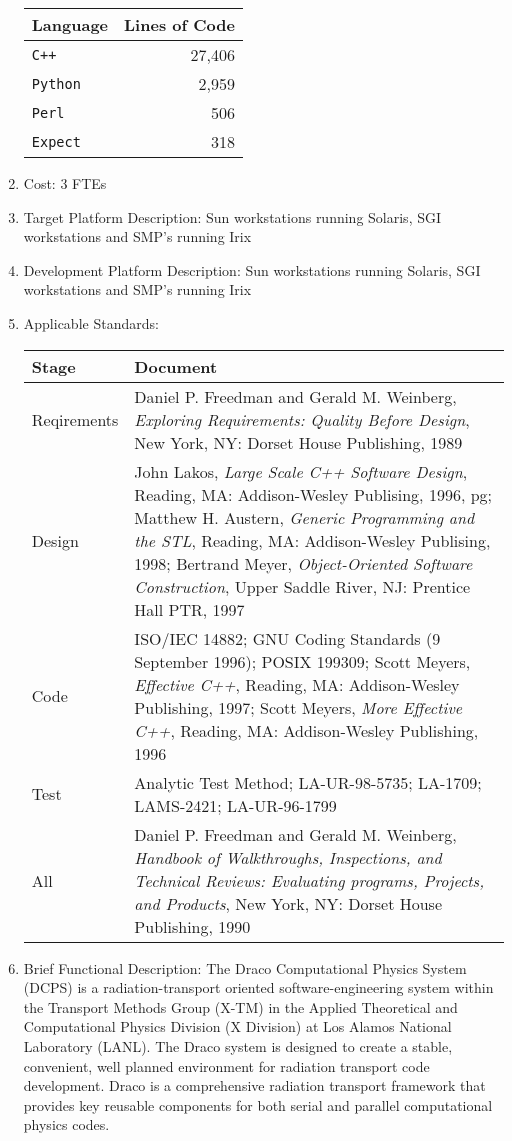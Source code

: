 \begin{enumerate}
\begin{center}
\begin{tabular}{l|r}
Language & Lines of Code \\ \hline
{\tt C++} & 27,406 \\
{\tt Python} & 2,959 \\
{\tt Perl} & 506 \\
{\tt Expect} & 318
\end{tabular}
\end{center}
\item Cost: 3 FTEs
\item Target Platform Description: Sun workstations running Solaris,
SGI workstations and SMP's running Irix
\item Development Platform Description: Sun workstations running Solaris,
SGI workstations and SMP's running Irix
\item Applicable Standards:
\begin{center}
\begin{tabular}{l|p{3in}}
Stage & Document \\ \hline
Reqirements & Daniel P. Freedman and Gerald M. Weinberg, {\em
              Exploring Requirements: Quality Before Design}, New
              York, NY: Dorset House Publishing, 1989\\ 
Design      & John Lakos, {\em Large Scale C++ Software Design},
              Reading, MA: Addison-Wesley Publising, 1996, pg;
              Matthew H. Austern, {\em Generic Programming and the
              STL}, Reading, MA: Addison-Wesley Publising, 1998;
              Bertrand Meyer, {\em Object-Oriented Software
              Construction}, Upper Saddle River, NJ: Prentice Hall
	      PTR, 1997\\
Code        & ISO/IEC 14882; GNU Coding Standards (9 September 1996); 
	      POSIX 199309; Scott Meyers, {\em Effective C++},
              Reading, MA: Addison-Wesley Publishing, 1997; Scott
              Meyers, {\em More Effective C++}, Reading, MA:
              Addison-Wesley Publishing, 1996 \\
Test        & Analytic Test Method; LA-UR-98-5735; LA-1709; LAMS-2421;
              LA-UR-96-1799 \\ 
All         & Daniel P. Freedman and Gerald M. Weinberg, {\em Handbook
              of Walkthroughs, Inspections, and Technical Reviews:
              Evaluating programs, Projects, and Products}, New
              York, NY: Dorset House Publishing, 1990
\end{tabular}
\end{center}
\item Brief Functional Description: The Draco Computational Physics
System (DCPS) is a radiation-transport oriented software-engineering
system within the Transport Methods Group (X-TM) in the Applied
Theoretical and Computational Physics Division (X Division) at Los
Alamos National Laboratory (LANL). The Draco system is designed to
create a stable, convenient, well planned environment for radiation
transport code development. Draco is a comprehensive radiation
transport framework that provides key reusable components for both
serial and parallel computational physics codes.
\end{enumerate}
